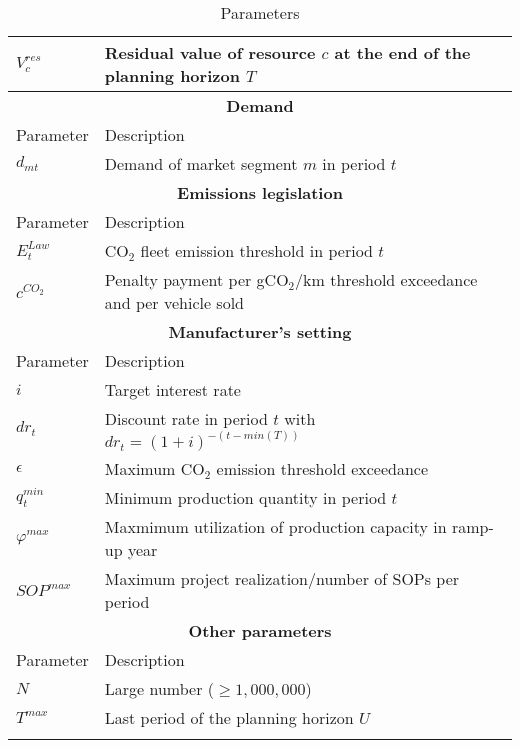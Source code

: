 \begin{longtable}{lp{11cm}}
$V_c^{res}$ & Residual value of resource $c$ at the end of the planning horizon $T$\\[0.5em]
\toprule[0.15em]
\multicolumn{2}{c}{\textbf{Demand}} \\
\midrule
Parameter & Description\\
\midrule
$d_{mt}$ & Demand of market segment $m$ in period $t$\\[0.5em]
\toprule[0.15em]
\multicolumn{2}{c}{\textbf{Emissions legislation}} \\
\midrule
Parameter & Description\\
\midrule
$E_t^{Law}$ & $\text{CO}_2$ fleet emission threshold in period $t$\\[0.5em]
$c^{CO_2}$ & Penalty payment per g$\text{CO}_2$/km threshold exceedance and per vehicle sold\\[0.5em]
\toprule[0.15em]
\multicolumn{2}{c}{\textbf{Manufacturer's setting}} \\
\midrule
Parameter & Description\\
\midrule
$i$ & Target interest rate\\[0.5em]
$dr_t$ & Discount rate in period $t$ with $dr_t = (1+i)^{-(t-min(T))}$\\[0.5em]
$\epsilon$ & Maximum $\text{CO}_2$ emission threshold exceedance\\[0.5em]
$q_t^{min}$ & Minimum production quantity in period $t$\\[0.5em]
$\varphi ^{max}$ & Maxmimum utilization of production capacity in ramp-up year\\[0.5em]
$SOP^{max}$ & Maximum project realization/number of \gls{SOP}s per period\\[0.5em]
\toprule[0.15em]
\multicolumn{2}{c}{\textbf{Other parameters}} \\
\midrule
Parameter & Description\\
\midrule
$N$ & Large number ($\geq 1,000,000$)\\[0.5em]
$T^{max}$ & Last period of the planning horizon $U$ \\[0.5em]
\bottomrule
\caption{Parameters}\label{tab:parameters}
\end{longtable}
